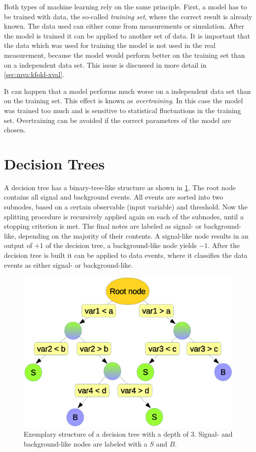 Both types of machine learning rely on the same principle.
First, a model has to be trained with data, the so-called \emph{training set}, where the correct result is already known.
The data used can either come from measurements or simulation.
After the model is trained it can be applied to another set of data.
It is important that the data which was used for training the model is not used in the real measurement, because
the model would perform better on the training set than on a independent data set.
This issue is discussed in more detail in \cref{sec:mva:kfold-xval}.

It can happen that a model performs much worse on a independent data set than on the training set.
This effect is known as \emph{overtraining}.
In this case the model was trained too much and is sensitive to statistical fluctuations in the training set.
Overtraining can be avoided if the correct parameters of the model are chosen.

\section{Decision Trees}\label{sec:bdt:decision_trees}

A decision tree has a binary-tree-like structure as shown in \cref{fig:bdt:dt}.
The root node contains all signal and background events.
All events are sorted into two subnodes, based on a certain observable (input variable) and threshold.
Now the splitting procedure is recursively applied again on each of the subnodes, until a
stopping criterion is met.
The final notes are labeled as signal- or background-like, depending on the majority of their contents.
A signal-like node results in an output of $+1$ of the decision tree, a background-like node yields $-1$.
After the decision tree is built it can be applied to data events, where it classifies the data events as either
signal- or background-like.

\begin{figure}[htb]
    \begin{center}
        \includegraphics[width=0.8\linewidth]{./figures/bdts/DT.eps}
        \caption{Exemplary structure of a decision tree with a depth of $3$.
                 Signal- and background-like nodes are labeled with a $S$ and $B$.}\label{fig:bdt:dt}
    \end{center}
\end{figure}

